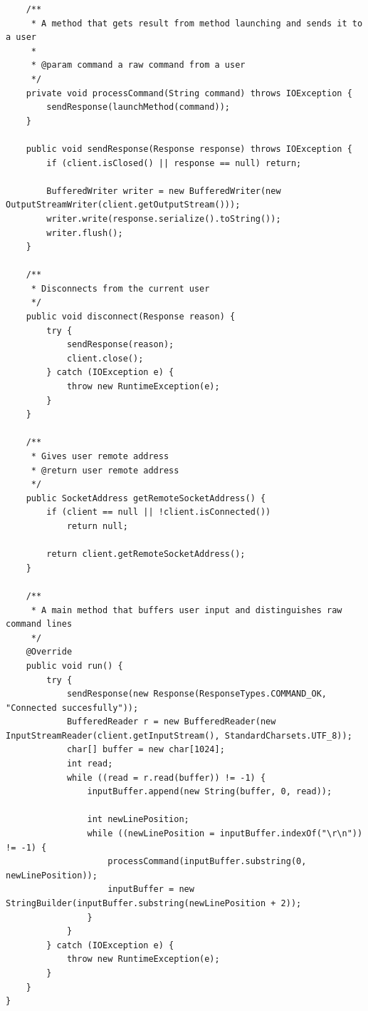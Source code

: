 \documentclass[a4paper,14pt]{extarticle}
\begin{document}
\begin{verbatim}
    /**
     * A method that gets result from method launching and sends it to a user
     *
     * @param command a raw command from a user
     */
    private void processCommand(String command) throws IOException {
        sendResponse(launchMethod(command));
    }

    public void sendResponse(Response response) throws IOException {
        if (client.isClosed() || response == null) return;

        BufferedWriter writer = new BufferedWriter(new OutputStreamWriter(client.getOutputStream()));
        writer.write(response.serialize().toString());
        writer.flush();
    }

    /**
     * Disconnects from the current user
     */
    public void disconnect(Response reason) {
        try {
            sendResponse(reason);
            client.close();
        } catch (IOException e) {
            throw new RuntimeException(e);
        }
    }

    /**
     * Gives user remote address
     * @return user remote address
     */
    public SocketAddress getRemoteSocketAddress() {
        if (client == null || !client.isConnected())
            return null;

        return client.getRemoteSocketAddress();
    }

    /**
     * A main method that buffers user input and distinguishes raw command lines
     */
    @Override
    public void run() {
        try {
            sendResponse(new Response(ResponseTypes.COMMAND_OK, "Connected succesfully"));
            BufferedReader r = new BufferedReader(new InputStreamReader(client.getInputStream(), StandardCharsets.UTF_8));
            char[] buffer = new char[1024];
            int read;
            while ((read = r.read(buffer)) != -1) {
                inputBuffer.append(new String(buffer, 0, read));

                int newLinePosition;
                while ((newLinePosition = inputBuffer.indexOf("\r\n")) != -1) {
                    processCommand(inputBuffer.substring(0, newLinePosition));
                    inputBuffer = new StringBuilder(inputBuffer.substring(newLinePosition + 2));
                }
            }
        } catch (IOException e) {
            throw new RuntimeException(e);
        }
    }
}
\end{verbatim}
\end{document}
